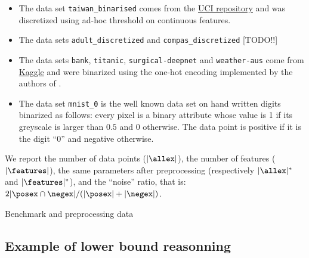 \documentclass{article}
\begin{document}
\begin{itemize}
	\item The data set \texttt{taiwan\_binarised} comes from the \href{https://archive.ics.uci.edu/ml/index.php}{UCI repository} and was discretized using ad-hoc threshold on continuous features.
	\item The data sets \texttt{adult\_discretized} and \texttt{compas\_discretized} [TODO!!]
	\item The data sets \texttt{bank}, \texttt{titanic}, \texttt{surgical-deepnet} and \texttt{weather-aus} come from \href{https://www.kaggle.com/}{Kaggle} and were binarized using the one-hot encoding implemented by the authors of  \cite{narodytska2018learning}.
	\item The data set \texttt{mnist\_0} is the well known data set on hand written digits binarized as follows: every pixel is a binary attribute whose value is 1 if its greyscale is larger than $0.5$ and 0 otherwise. The data point is positive if it is the digit ``0'' and negative otherwise.
\end{itemize}

We report the number of data points ($|\allex|$), the number of features ($|\features|$), the same parameters after preprocessing (respectively $|\allex|^*$ and $|\features|^*$), and the ``noise'' ratio, that is: $2|\posex \cap \negex|/(|\posex|+|\negex|)$.



\begin{table}[htbp]%
\begin{center}%
\begin{scriptsize}%
\tabcolsep=10pt%
%
\end{scriptsize}%
\end{center}%
\caption{\label{tab:info} Benchmark and preprocessing data}%
\end{table}%


\subsection{Example of lower bound reasonning}
\label{appendix:lb}
\end{document}
